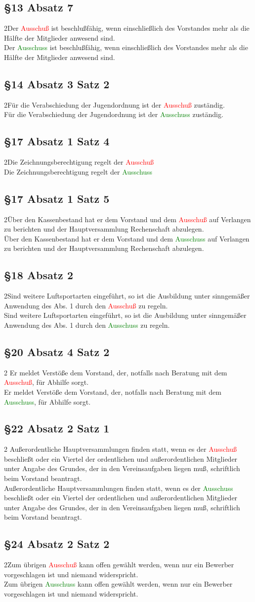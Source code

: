\documentclass[10pt,a4paper,parskip=half]{scrartcl}
\newcommand{\new}[1]{\textcolor{Green}{#1}}
\newcommand{\old}[1]{\textcolor{Red}{#1}}
\newcommand{\compare}[3]{\subsection*{#1}\begin{multicols}{2}#2\columnbreak\\#3\end{multicols}}
\begin{document}
  \compare{§13 Absatz 7}
  {Der \old{Ausschuß} ist beschlußfähig, wenn einschließlich des Vorstandes mehr als die Hälfte der Mitglieder anwesend sind.}
  {Der \new{Ausschuss} ist beschlußfähig, wenn einschließlich des Vorstandes mehr als die Hälfte der Mitglieder anwesend sind.}

  \compare{§14 Absatz 3 Satz 2}
  {Für die Verabschiedung der Jugendordnung ist der \old{Ausschuß} zuständig.}
  {Für die Verabschiedung der Jugendordnung ist der \new{Ausschuss} zuständig.}
    
  \compare{§17 Absatz 1 Satz 4}{Die Zeichnungsberechtigung regelt der \old{Ausschuß}}{Die Zeichnungsberechtigung regelt der \new{Ausschuss}}
  \compare{§17 Absatz 1 Satz 5}{Über den Kassenbestand hat er dem Vorstand und dem \old{Ausschuß} auf Verlangen zu berichten und der Hauptversammlung Rechenschaft abzulegen.}{Über den Kassenbestand hat er dem Vorstand und dem \new{Ausschuss} auf Verlangen zu berichten und der Hauptversammlung Rechenschaft abzulegen.}

  \compare{§18 Absatz 2}{Sind weitere Luftsportarten eingeführt, so ist die Ausbildung unter sinngemäßer Anwendung des
  Abs. 1 durch den \old{Ausschuß} zu regeln.}{Sind weitere Luftsportarten eingeführt, so ist die Ausbildung unter sinngemäßer Anwendung des
  Abs. 1 durch den \new{Ausschuss} zu regeln.}

  \compare{§20 Absatz 4 Satz 2}{
    Er meldet Verstöße dem Vorstand, der, notfalls nach Beratung mit dem \old{Ausschuß}, für Abhilfe sorgt.
  }{
    Er meldet Verstöße dem Vorstand, der, notfalls nach Beratung mit dem \new{Ausschuss}, für Abhilfe sorgt.
  }

  \compare{§22 Absatz 2 Satz 1}
   {
    Außerordentliche Hauptversammlungen finden statt,
    wenn es der \old{Ausschuß} beschließt oder ein Viertel der ordentlichen und außerordentlichen Mitglieder unter Angabe des Grundes,
    der in den Vereinsaufgaben liegen muß,
    schriftlich beim Vorstand beantragt.
    }
   {
    Außerordentliche Hauptversammlungen finden statt,
    wenn es der \new{Ausschuss} beschließt oder ein Viertel der ordentlichen und außerordentlichen Mitglieder unter Angabe des Grundes,
    der in den Vereinsaufgaben liegen muß,
    schriftlich beim Vorstand beantragt.
    }

  \compare{§24 Absatz 2 Satz 2}
  {Zum übrigen \old{Ausschuß} kann offen gewählt werden, wenn nur ein Bewerber vorgeschlagen ist und niemand widerspricht.}
  {Zum übrigen \new{Ausschuss} kann offen gewählt werden, wenn nur ein Bewerber vorgeschlagen ist und niemand widerspricht.}
\end{document}
